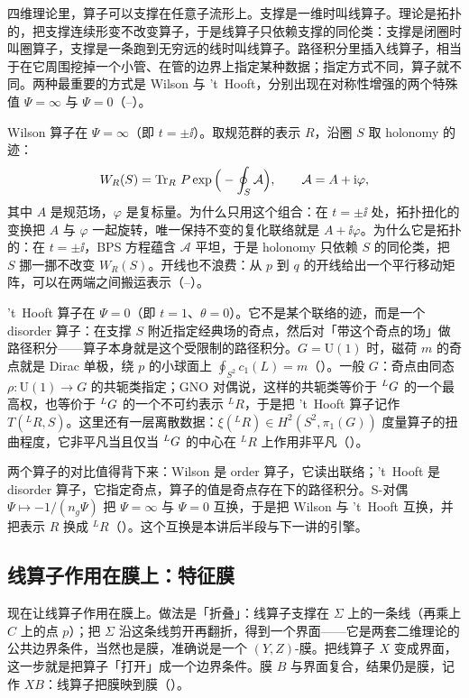 四维理论里，算子可以支撑在任意子流形上。支撑是一维时叫线算子。理论是拓扑的，把支撑连续形变不改变算子，于是线算子只依赖支撑的同伦类：支撑是闭圈时叫圈算子，支撑是一条跑到无穷远的线时叫线算子。路径积分里插入线算子，相当于在它周围挖掉一个小管、在管的边界上指定某种数据；指定方式不同，算子就不同。两种最重要的方式是 Wilson 与 't~Hooft，分别出现在对称性增强的两个特殊值 $\Psi=\infty$ 与 $\Psi=0$（--）。

Wilson 算子在 $\Psi=\infty$（即 $t=\pm\ii$）。取规范群的表示 $R$，沿圈 $S$ 取 holonomy 的迹：
\begin{equation}
W_R(S)=\operatorname{Tr}_R\,P\exp\Big(-\oint_S\mathcal A\Big),\qquad \mathcal A=A+\mathrm{i}\varphi,
\label{eq:wilson}
\end{equation}
其中 $A$ 是规范场，$\varphi$ 是复标量。为什么只用这个组合：在 $t=\pm\ii$ 处，拓扑扭化的变换把 $A$ 与 $\varphi$ 一起旋转，唯一保持不变的复化联络就是 $A+\ii\varphi$。为什么它是拓扑的：在 $t=\pm\ii$，BPS 方程蕴含 $\mathcal A$ 平坦，于是 holonomy 只依赖 $S$ 的同伦类，把 $S$ 挪一挪不改变 $W_R(S)$。开线也不浪费：从 $p$ 到 $q$ 的开线给出一个平行移动矩阵，可以在两端之间搬运表示（--）。

't~Hooft 算子在 $\Psi=0$（即 $t=1$、$\theta=0$）。它不是某个联络的迹，而是一个 disorder 算子：在支撑 $S$ 附近指定经典场的奇点，然后对「带这个奇点的场」做路径积分——算子本身就是这个受限制的路径积分。$G=\mathrm{U}(1)$ 时，磁荷 $m$ 的奇点就是 Dirac 单极，绕 $p$ 的小球面上 $\oint_{S^2}c_1(L)=m$（）。一般 $G$：奇点由同态 $\rho:\mathrm{U}(1)\to G$ 的共轭类指定；GNO 对偶说，这样的共轭类等价于 ${}^{L}G$ 的一个最高权，也等价于 ${}^{L}G$ 的一个不可约表示 ${}^{L}R$，于是把 't~Hooft 算子记作 $T({}^{L}R,S)$。这里还有一层离散数据：$\xi({}^{L}R)\in H^2(S^2,\pi_1(G))$ 度量算子的扭曲程度，它非平凡当且仅当 ${}^{L}G$ 的中心在 ${}^{L}R$ 上作用非平凡（）。

两个算子的对比值得背下来：Wilson 是 order 算子，它读出联络；'t~Hooft 是 disorder 算子，它指定奇点，算子的值是奇点存在下的路径积分。S-对偶 $\Psi\mapsto-1/(n_g\Psi)$ 把 $\Psi=\infty$ 与 $\Psi=0$ 互换，于是把 Wilson 与 't~Hooft 互换，并把表示 $R$ 换成 ${}^{L}R$（）。这个互换是本讲后半段与下一讲的引擎。

\subsection{线算子作用在膜上：特征膜}

现在让线算子作用在膜上。做法是「折叠」：线算子支撑在 $\Sigma$ 上的一条线（再乘上 $C$ 上的点 $p$）；把 $\Sigma$ 沿这条线剪开再翻折，得到一个界面——它是两套二维理论的公共边界条件，当然也是膜，准确说是一个 $(Y,Z)$-膜。把线算子 $X$ 变成界面，这一步就是把算子「打开」成一个边界条件。膜 $B$ 与界面复合，结果仍是膜，记作 $XB$：线算子把膜映到膜（）。

